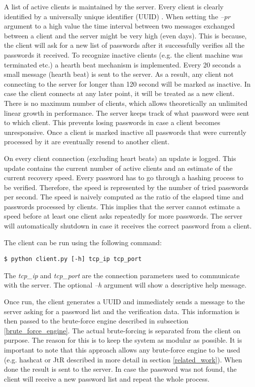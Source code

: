 \documentclass[11pt,oneside]{fithesis2}
\begin{document}
A list of active clients is maintained by the server. Every client is clearly identified by a universally unique identifier (UUID) \cite{rfc4122}. When setting the \textit{–pr} argument to a high value the time interval between two messages exchanged between a client and the server might be very high (even days). This is because, the client will ask for a new list of passwords after it successfully verifies all the passwords it received. To recognize inactive clients (e.g. the client machine was terminated etc.) a hearth beat mechanism is implemented. Every 20 seconds a small message (hearth beat) is sent to the server. As a result, any client not connecting to the server for longer than 120 second will be marked as inactive. In case the client connects at any later point, it will be treated as a new client. There is no maximum number of clients, which allows theoretically an unlimited linear growth in performance. The server keeps track of what password were sent to which client. This prevents losing passwords in case a client becomes unresponsive. Once a client is marked inactive all passwords that were currently processed by it are eventually resend to another client. 

On every client connection (excluding heart beats) an update is logged. This update contains the current number of active clients and an estimate of the current recovery speed. Every password has to go through a hashing process to be verified. Therefore, the speed is represented by the number of tried passwords per second. The speed is naively computed as the ratio of the elapsed time and passwords processed by clients. This implies that the server cannot estimate a speed before at least one client asks repeatedly for more passwords. The server will automatically shutdown in case it receives the correct password from a client.

The client can be run using the following command:
\begin{lstlisting}
$ python client.py [-h] tcp_ip tcp_port 
\end{lstlisting}

The \textit{tcp\_ip} and \textit{tcp\_port} are the connection parameters used to communicate with the server. The optional \textit{–h} argument will show a descriptive help message. 

Once run, the client generates a UUID and immediately sends a message to the server asking for a password list and the verification data. This information is then passed to the brute-force engine described in subsection \ref{brute_force_engine}. The actual brute-forcing is separated from the client on purpose. The reason for this is to keep the system as modular as possible. It is important to note that this approach allows any brute-force engine to be used (e.g. hashcat or JtR \cite{hashcat, jtr} described in more detail in section \ref{related_work}). When done the result is sent to the server. In case the password was not found, the client will receive a new password list and repeat the whole process.
\end{document}
